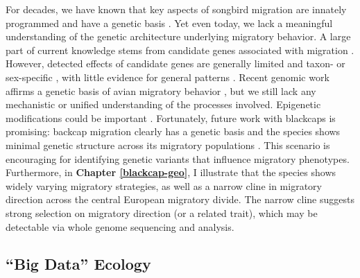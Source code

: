 \documentclass[a4paper, nobind]{templates/ociamthesis}
\begin{document}
For decades, we have known that key aspects of songbird migration are innately programmed and have a genetic basis \autocites[e.g.~][]{bertholdGeneticBasisMigratory1981}{bertholdHeritabilityMigratoryActivity1994}{gwinnerCircannualClocksAvian1996}{helbigGeneticBasisMode1996}{pulidoFrequencyMigrantsMigratory1996}. Yet even today, we lack a meaningful understanding of the genetic architecture underlying migratory behavior. A large part of current knowledge stems from candidate genes associated with migration \autocites[e.g.~][]{muellerIdentificationGeneAssociated2011}{sainoPolymorphismClockGene2015}{johnstonSeasonalGeneExpression2016}{lugoramosCandidateGenesMigration2017}. However, detected effects of candidate genes are generally limited and taxon- or sex-specific \autocite{muellerIdentificationGeneAssociated2011,sainoPolymorphismClockGene2015,mettlerInteractionsCandidateGene2015,bazziCandidateGenesHave2017,bazziAdcyap1PolymorphismCovaries2016,parody-merinoNoEvidenceAssociation2019,ralstonLengthPolymorphismsTwo2019}, with little evidence for general patterns \autocites{lugoramosCandidateGenesMigration2017}[but see e.g.~][]{bazziClockGenePolymorphism2016}. Recent genomic work affirms a genetic basis of avian migratory behavior \autocite{delmoreGeneticsSeasonalMigration2016,toewsSelectionVPS13ALinked2019a}, but we still lack any mechanistic or unified understanding of the processes involved. Epigenetic modifications could be important \autocite{sainoMigrationPhenologyBreeding2017}. Fortunately, future work with blackcaps is promising: backcap migration clearly has a genetic basis \autocite{bertholdRapidMicroevolutionMigratory1992,helbigInheritanceNovelMigratory1994,helbigGeneticBasisMode1996} and the species shows minimal genetic structure across its migratory populations \autocite[Delmore et al., manuscript in review; but also see][]{rolshausenContemporaryEvolutionReproductive2009}. This scenario is encouraging for identifying genetic variants that influence migratory phenotypes. Furthermore, in \textbf{Chapter \ref{blackcap-geo}}, I illustrate that the species shows widely varying migratory strategies, as well as a narrow cline in migratory direction across the central European migratory divide. The narrow cline suggests strong selection on migratory direction (or a related trait), which may be detectable via whole genome sequencing and analysis.

\hypertarget{big-data-ecology}{%
\subsection*{``Big Data'' Ecology}\label{big-data-ecology}}
\end{document}

